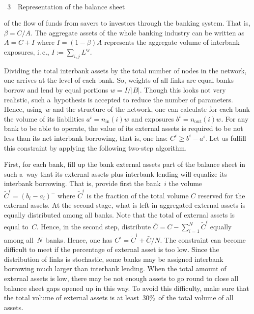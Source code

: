 \begin{multicols}{2}
\columnbreak

 { \begin{center}  %
 \vspace*{-3pt}
 \mbox{%
\epsfxsize=78.001mm
}




\noindent
{{\figurename~3}\ \ \small{Representation of the balance sheet}}
\end{center}
}

\vspace*{9pt}

\addtocounter{figure}{1}




\noindent
 of the flow of funds from savers to investors through 
the banking system. That is, $\beta = C/A$.
 The aggregate assets of the whole banking industry can be written as $A = C + 
I$ where $I=(1- \beta)A$ represents the aggregate volume of interbank 
exposures, i.\,e., $I:=\sum\nolimits_{i,j}L^{ij}$.  


Dividing the total interbank assets by the total number of nodes in the network, 
one arrives at the level of each bank.  So, weights of all links are equal banks 
borrow and lend by equal  portions $w=I/|B|$. Though this looks not very 
realistic,  such a~hypothesis is accepted to reduce the number of parameters.  
Hence, using~$w$ and the structure of the network, one
can calculate for each bank the volume of its liabilities $a^i=n_{\mathrm{in}}(i)w$ and  
exposures $b ^i=n_{\mathrm{out}}(i)w$.
For any bank to be able to operate, the value of its external 
assets is required to be not less than its net interbank borrowing, that is, 
one has:
 $C^i \ge 
b^i- a^i$. Let us fulfill this constraint by applying the following two-step 
algorithm.

First, for each bank, fill up the bank external assets part of the balance 
sheet in such a~way that its external assets plus interbank lending will 
equalize its interbank borrowing. That is, provide first the bank~$i$ the 
volume $\tilde C^i = (b_i-a_i)^-$ where $\tilde C^i$ is the fraction of the 
total volume $C$ reserved for the external assets.
At the second stage,  what is left in aggregated external assets is equally 
distributed among all banks. Note that the total of external assets is equal to~$C$. 
Hence, in the second step, distribute $\bar C =C- \sum^N_{i=1} \tilde 
C^i$ equally among all~$N$~banks. Hence, one has $C^i = \tilde C^i +\bar C/N $. 
The constraint can become difficult to meet if the percentage of external asset 
is too low. Since the distribution of links is stochastic, some banks may be 
assigned interbank borrowing much larger than interbank lending. When the total 
amount of external assets is low, there may be not enough assets to go round to 
close all balance sheet gaps opened up in this way. To avoid this difficulty,  
make sure that the total volume of external assets is at least~30\%~of the total 
volume of all assets.


\end{multicols}
